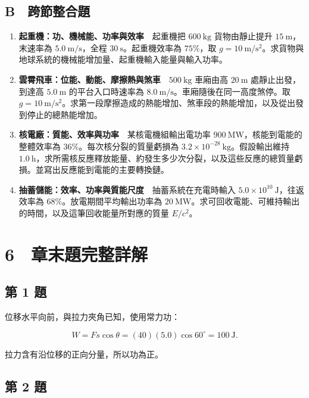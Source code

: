 \documentclass[11pt,a4paper]{article}
\begin{document}
\subsection{B　跨節整合題}\label{b-ux8de8ux7bc0ux6574ux5408ux984c}

\begin{enumerate}
\def\labelenumi{\arabic{enumi}.}
\setcounter{enumi}{12}
\item
  \textbf{起重機：功、機械能、功率與效率}　起重機把 \(600\ \mathrm{kg}\) 貨物由靜止提升 \(15\ \mathrm m\)，末速率為 \(5.0\ \mathrm{m/s}\)，全程 \(30\ \mathrm s\)。起重機效率為 \(75\%\)，取 \(g=10\ \mathrm{m/s^2}\)。求貨物與地球系統的機械能增加量、起重機輸入能量與輸入功率。
\item
  \textbf{雲霄飛車：位能、動能、摩擦熱與煞車}　\(500\ \mathrm{kg}\) 車廂由高 \(20\ \mathrm m\) 處靜止出發，到達高 \(5.0\ \mathrm m\) 的平台入口時速率為 \(8.0\ \mathrm{m/s}\)。車廂隨後在同一高度煞停。取 \(g=10\ \mathrm{m/s^2}\)。求第一段摩擦造成的熱能增加、煞車段的熱能增加，以及從出發到停止的總熱能增加。
\item
  \textbf{核電廠：質能、效率與功率}　某核電機組輸出電功率 \(900\ \mathrm{MW}\)，核能到電能的整體效率為 \(36\%\)。每次核分裂的質量虧損為 \(3.2\times10^{-28}\ \mathrm{kg}\)。假設輸出維持 \(1.0\ \mathrm h\)，求所需核反應釋放能量、約發生多少次分裂，以及這些反應的總質量虧損。並寫出反應能到電能的主要轉換鏈。
\item
  \textbf{抽蓄儲能：效率、功率與質能尺度}　抽蓄系統在充電時輸入 \(5.0\times10^{10}\ \mathrm J\)，往返效率為 \(68\%\)。放電期間平均輸出功率為 \(20\ \mathrm{MW}\)。求可回收電能、可維持輸出的時間，以及這筆回收能量所對應的質量 \(E/c^2\)。
\end{enumerate}

\section{6　章末題完整詳解}\label{ux7ae0ux672bux984cux5b8cux6574ux8a73ux89e3}

\subsection{第 1 題}\label{ux7b2c-1-ux984c}

位移水平向前，與拉力夾角已知，使用常力功：

\[
W=Fs\cos\theta=(40)(5.0)\cos60^\circ=100\ \mathrm J.
\]

拉力含有沿位移的正向分量，所以功為正。

\subsection{第 2 題}\label{ux7b2c-2-ux984c}
\end{document}
